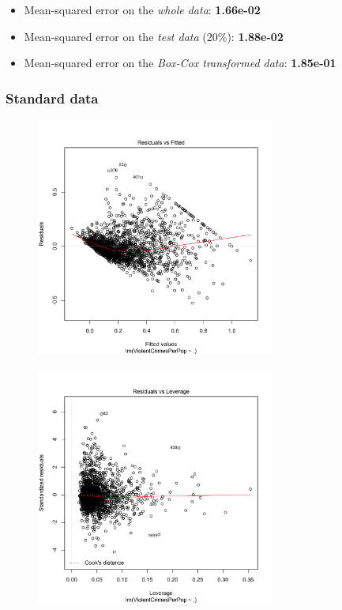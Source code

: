 \documentclass[12pt,a4paper]{article}
\begin{document}
\begin{singlespace}
\begin{itemize}
	\item Mean-squared error on the \emph{whole data}: \textbf{1.66e-02}
  	\item Mean-squared error on the \emph{test data} (20\%): \textbf{1.88e-02}
  	\item Mean-squared error on the \emph{Box-Cox transformed data}: \textbf{1.85e-01}
\end{itemize}

\newpage
\subsubsection{Standard data}
\vspace{-0.5cm}
\begin{figure}[h!]
    \centering
    \includegraphics[width=0.7\textwidth,trim= 0 0 20 30, clip]{Linear_regression_residuals.pdf}
\end{figure}

\vspace{-0.5cm}
\begin{figure}[h!]
    \centering
    \includegraphics[width=0.7\textwidth,trim= 0 0 20 30, clip]{Linear_regression_cook.pdf}
\end{figure}
\FloatBarrier


\end{singlespace}
\end{document}
